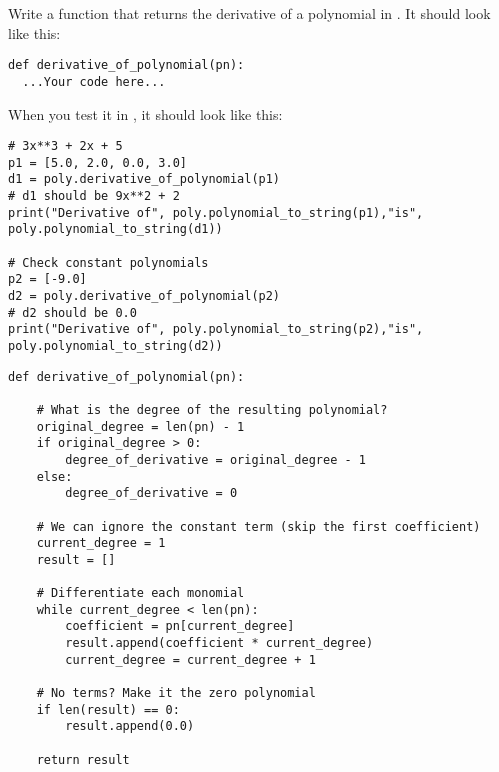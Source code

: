 \begin{Exercise}[title={Differentation of polynomials in Python}, label=pydiffpoly]
  Write a function that returns the derivative of a polynomial in . It should look like this:
\begin{Verbatim}
def derivative_of_polynomial(pn):
  ...Your code here...
\end{Verbatim}
When you test it in , it should look like this:
\begin{Verbatim}
# 3x**3 + 2x + 5
p1 = [5.0, 2.0, 0.0, 3.0]
d1 = poly.derivative_of_polynomial(p1)
# d1 should be 9x**2 + 2
print("Derivative of", poly.polynomial_to_string(p1),"is", poly.polynomial_to_string(d1))

# Check constant polynomials
p2 = [-9.0]
d2 = poly.derivative_of_polynomial(p2)
# d2 should be 0.0
print("Derivative of", poly.polynomial_to_string(p2),"is", poly.polynomial_to_string(d2))
\end{Verbatim}
\end{Exercise}
\begin{Answer}[ref=pydiffpoly]
\begin{Verbatim}
def derivative_of_polynomial(pn):

    # What is the degree of the resulting polynomial?
    original_degree = len(pn) - 1
    if original_degree > 0:
        degree_of_derivative = original_degree - 1
    else:
        degree_of_derivative = 0

    # We can ignore the constant term (skip the first coefficient)
    current_degree = 1
    result = []

    # Differentiate each monomial
    while current_degree < len(pn):
        coefficient = pn[current_degree]
        result.append(coefficient * current_degree)
        current_degree = current_degree + 1

    # No terms? Make it the zero polynomial
    if len(result) == 0:
        result.append(0.0)

    return result
\end{Verbatim}
\end{Answer}
